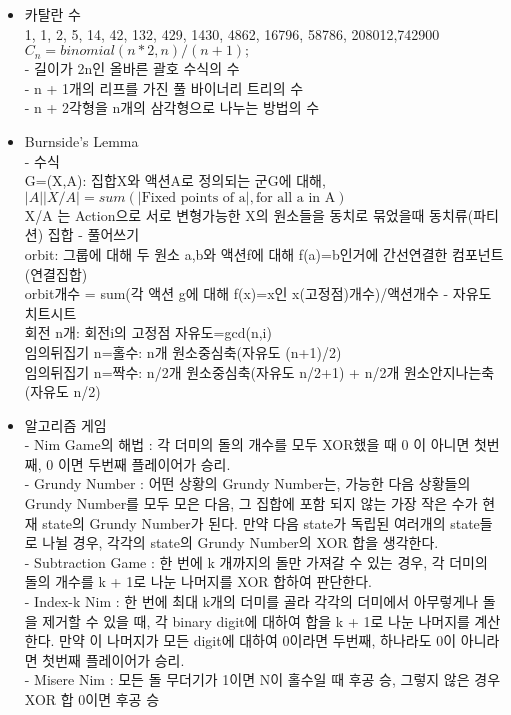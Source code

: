 \documentclass[landscape, 8pt, a4paper, oneside, twocolumn]{extarticle}
\begin{document}
{}{}{}{}{}
\begin{itemize}
\setlength\itemsep{0.1em}
    
\item 카탈란 수\\
1, 1, 2, 5, 14, 42, 132, 429, 1430, 4862, 16796, 58786, 208012,742900\\
$C_n = binomial(n * 2, n) / (n + 1);$\\
- 길이가 2n인 올바른 괄호 수식의 수\\
- n + 1개의 리프를 가진 풀 바이너리 트리의 수\\
- n + 2각형을 n개의 삼각형으로 나누는 방법의 수

\item Burnside’s Lemma\\
- 수식\\
G=(X,A): 집합X와 액션A로 정의되는 군G에 대해, $\vert A\vert\vert X/A \vert=sum(\vert \text{Fixed points of a}\vert,\text{for all a in A})$\\
X/A 는 Action으로 서로 변형가능한 X의 원소들을 동치로 묶었을때 동치류(파티션) 집합
- 풀어쓰기\\
orbit: 그룹에 대해 두 원소 a,b와 액션f에 대해 f(a)=b인거에 간선연결한 컴포넌트(연결집합)\\
orbit개수 = sum(각 액션 g에 대해 f(x)=x인 x(고정점)개수)/액션개수
- 자유도 치트시트\\
회전 n개: 회전i의 고정점 자유도=gcd(n,i)\\
임의뒤집기 n=홀수: n개 원소중심축(자유도 (n+1)/2)\\
임의뒤집기 n=짝수: n/2개 원소중심축(자유도 n/2+1) + n/2개 원소안지나는축(자유도 n/2)

\item 알고리즘 게임\\
- Nim Game의 해법 : 각 더미의 돌의 개수를 모두 XOR했을 때 0 이 아니면 첫번째, 0 이면 두번째 플레이어가 승리.\\
- Grundy Number : 어떤 상황의 Grundy Number는, 가능한 다음 상황들의 Grundy Number를 모두 모은 다음, 그 집합에 포함 되지 않는 가장 작은 수가 현재 state의 Grundy Number가 된다. 만약 다음 state가 독립된 여러개의 state들로 나뉠 경우, 각각의 state의 Grundy Number의 XOR 합을 생각한다.\\
- Subtraction Game : 한 번에 k 개까지의 돌만 가져갈 수 있는 경우, 각 더미의 돌의 개수를 k + 1로 나눈 나머지를 XOR 합하여 판단한다.\\
- Index-k Nim : 한 번에 최대 k개의 더미를 골라 각각의 더미에서 아무렇게나 돌을 제거할 수 있을 때, 각 binary digit에 대하여 합을 k + 1로 나눈 나머지를 계산한다. 만약 이 나머지가 모든 digit에 대하여 0이라면 두번째, 하나라도 0이 아니라면 첫번째 플레이어가 승리.\\
- Misere Nim : 모든 돌 무더기가 1이면 N이 홀수일 때 후공 승, 그렇지 않은 경우 XOR 합 0이면 후공 승


\end{itemize}
\end{document}
